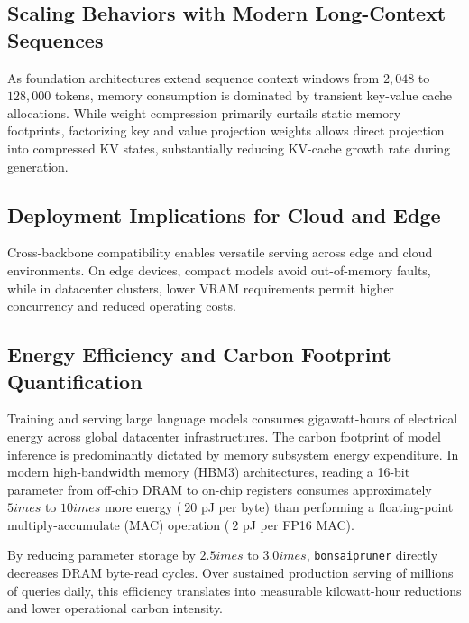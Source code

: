 \subsection{Scaling Behaviors with Modern Long-Context Sequences}
As foundation architectures extend sequence context windows from $2{,}048$ to $128{,}000$ tokens, memory consumption is dominated by transient key-value cache allocations. While weight compression primarily curtails static memory footprints, factorizing key and value projection weights allows direct projection into compressed KV states, substantially reducing KV-cache growth rate during generation.

\subsection{Deployment Implications for Cloud and Edge}
Cross-backbone compatibility enables versatile serving across edge and cloud environments. On edge devices, compact models avoid out-of-memory faults, while in datacenter clusters, lower VRAM requirements permit higher concurrency and reduced operating costs.

\subsection{Energy Efficiency and Carbon Footprint Quantification}
Training and serving large language models consumes gigawatt-hours of electrical energy across global datacenter infrastructures. The carbon footprint of model inference is predominantly dictated by memory subsystem energy expenditure. In modern high-bandwidth memory (HBM3) architectures, reading a 16-bit parameter from off-chip DRAM to on-chip registers consumes approximately $5	imes$ to $10	imes$ more energy ($~20$ pJ per byte) than performing a floating-point multiply-accumulate (MAC) operation ($~2$ pJ per FP16 MAC).

By reducing parameter storage by $2.5	imes$ to $3.0	imes$, \texttt{bonsaipruner} directly decreases DRAM byte-read cycles. Over sustained production serving of millions of queries daily, this efficiency translates into measurable kilowatt-hour reductions and lower operational carbon intensity.
